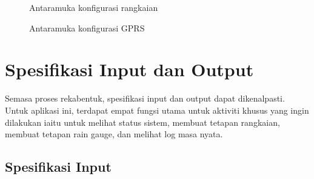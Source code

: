 \begin{figure}[H]
\caption[Antaramuka konfigurasi rangkaian]{Antaramuka konfigurasi rangkaian}
\label{c4:f6}
\end{figure}
\begin{figure}[H]
\caption[Antaramuka konfigurasi GPRS]{Antaramuka konfigurasi GPRS}
\label{c4:f7}
\end{figure}

\section{Spesifikasi Input dan Output}
Semasa proses rekabentuk, spesifikasi input dan output dapat dikenalpasti. Untuk aplikasi ini, terdapat empat fungsi utama untuk aktiviti khusus yang ingin dilakukan iaitu untuk melihat status sistem, membuat tetapan rangkaian, membuat tetapan rain gauge, dan melihat log masa nyata.

\subsection{Spesifikasi Input}

